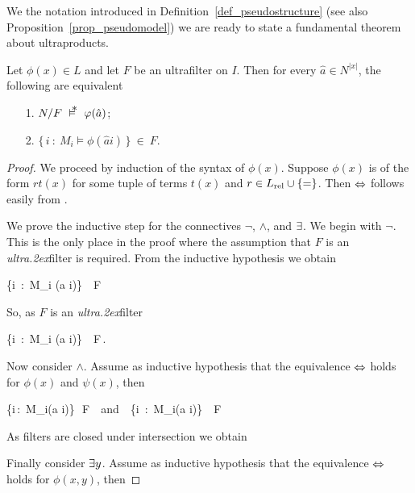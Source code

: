 \documentclass[creche.tex]{subfiles}
\begin{document}
We the notation introduced in Definition~\ref{def_pseudostructure} (see also Proposition~\ref{prop_pseudomodel}) we are ready to state a fundamental theorem about ultraproducts.

\begin{void_thm}[\L o\'{s} Theorem]\label{thm_los}
Let $\phi(x)\in L$ and let $F$ be an ultrafilter on $I$. Then for every $\hat a\in N^{|x|}$, the following are equivalent
\begin{itemize}
\item[1.] $N/F\ \pmodels\ \phi(\hat a)$;
\item[2.] $\big\{\,i\ :\ M_i\models \phi(\hat a i)\,\big\}\ \in\ F$.
\end{itemize}
\end{void_thm}

\begin{proof}
We proceed by induction of the syntax of $\phi(x)$. Suppose $\phi(x)$ is of the form $rt(x)$ for some tuple of terms $t(x)$ and $r\in L_{\rm rel}\cup\{=\}$. Then $\Leftrightarrow$ follows easily from .

We prove the inductive step for the connectives $\neg$, $\wedge$, and $\exists$. We begin with $\neg$. This is the only place in the proof where the assumption that $F$ is an \textit{ultra\kern.2ex}filter is required. From the inductive hypothesis we obtain

%
{\IFF}%
{\big\{i\ :\ M_i\; \models\; \phi(\hat a i)\;\big\}\ \notin\ F}

So, as $F$ is an \textit{ultra\kern.2ex}filter

\ceq{}{\IFF}%
{\big\{i\ :\ M_i\; \models\; \neg\phi(\hat a i)\;\big\}\ \in\ F\,.}

Now consider $\wedge$. Assume as inductive hypothesis that the equivalence $\Leftrightarrow$ holds for $\phi(x)$ and $\psi(x)$, then

%
{\IFF}%
{\big\{i\,:\, M_i\models\phi(\hat a i)\big\}\,\in\, F\ \ {\rm and}\ \ \big\{i\, :\, M_i\models\psi(\hat a i)\big\}\, \in\, F}

As filters are closed under intersection we obtain


Finally consider $\exists y$.  Assume as inductive hypothesis that the equivalence $\Leftrightarrow$ holds for $\phi(x,y)$, then


\end{proof}
\end{document}
